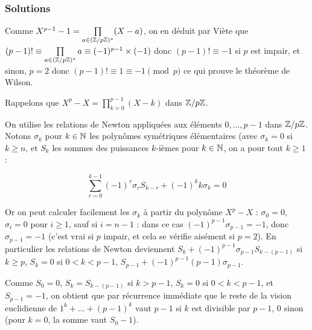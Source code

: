 \subsubsection{Solutions}


\begin{sol}
Comme $X^{p - 1} - 1=\prod\limits_{a\in (\mathbb Z/p\mathbb Z)^*}(X - a)$, on en déduit par Viète que $(p - 1)!\equiv \prod \limits_{a\in (\mathbb Z/p\mathbb Z)^*}a\equiv (-1)^{p - 1}\times (-1)$ donc $(p - 1)!\equiv -1$ si $p$ est impair, et sinon, $p=2$ donc $(p - 1)!\equiv 1\equiv -1\pmod{p}$ ce qui prouve le théorème de Wilson.
\end{sol}

\begin{sol}
Rappelons que $X^p - X=\prod\limits_{k=0}^{p - 1}(X - k)$ dans $\mathbb Z/p\mathbb Z$.

On utilise les relations de Newton appliquées aux éléments $0,\dots, p - 1$ dans $\mathbb Z/p\mathbb Z$. Notons $\sigma_k$ pour $k\in \mathbb N$ les polynômes symétriques élémentaires (avec $\sigma_{k}=0$ si $k\geq n$, et $S_k$ les sommes des puissances $k$-ièmes pour $k\in \mathbb N$, on a pour tout $k\geq 1$ :


$$\sum_{r=0}^{k - 1}(-1)^r\sigma_r S_{k - r} + (-1)^k k\sigma_k=0$$

Or on peut calculer facilement les $\sigma_k$ à partir du polynôme $X^p - X$ : $\sigma_0=0$, $\sigma_i=0$ pour $i\geq 1$, sauf si $i=n - 1$ : dans ce cas $(-1)^{p - 1}\sigma_{p - 1}=-1$, donc $\sigma_{p - 1}=-1$ (c'est vrai si $p$ impair, et cela se vérifie aisément si $p=2$).
En particulier les relations de Newton deviennent $S_{k} + (-1)^{p - 1}\sigma_{p - 1}S_{k - (p - 1)}$ si $k\geq p$, $S_k=0$ si $0<k<p - 1$, $S_{p - 1} + (-1)^{p - 1}(p - 1)\sigma_{p - 1}$.

Comme $S_0=0$, $S_k=S_{k - (p - 1)}$ si $k>p - 1$, $S_k=0$ si $0<k<p - 1$, et $S_{p - 1}=-1$, on obtient que par récurrence immédiate que le reste de la vision euclidienne de $1^k + \dots + (p - 1)^k$ vaut $p - 1$ si $k$ est divisible par $p - 1$, $0$ sinon (pour $k=0$, la somme vaut $S_0 - 1$).



\end{sol}

